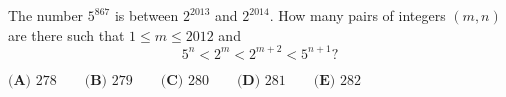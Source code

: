 The number $5^{867}$ is between $2^{2013}$ and $2^{2014}$. How many pairs of integers $\left(m,n\right)$ are there such that $1\leq m\leq2012$ and \[5^n<2^m<2^{m+2}<5^{n+1}?\]

$\textbf{(A) }278\qquad\textbf{(B) }279\qquad\textbf{(C) }280\qquad\textbf{(D) }281\qquad\textbf{(E) }282$